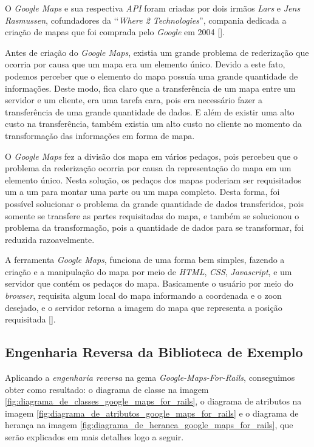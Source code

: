 O \emph{Google Maps} e sua respectiva \emph{API} foram criadas por dois irmãos \emph{Lars} e 
\emph{Jens Rasmussen}, cofundadores da ‘‘\emph{Where 2 Technologies}'', compania dedicada a criação de mapas
que foi comprada pelo \emph{Google} em 2004 [].

Antes de criação do \emph{Google Maps}, existia um grande problema de rederização que ocorria por causa
que um mapa era um elemento único. Devido a este fato, podemos perceber que o elemento do mapa
possuía uma grande quantidade de informações. Deste modo, fica claro que a transferência de um mapa entre
um servidor e um cliente, era uma tarefa cara, pois era necessário fazer a transferência de uma grande
quantidade de dados. E além de existir uma alto custo na transferência, também existia um alto custo no
cliente no momento da transformação das informações em forma de mapa.

O \emph{Google Maps} fez a divisão dos mapa em vários pedaços, pois percebeu que o problema da rederização 
ocorria por causa da representação do mapa em um elemento único. Nesta solução, os pedaços dos mapas
poderiam ser requisitados um a um para montar uma parte ou um mapa completo. Desta forma, foi possível
solucionar o problema da grande quantidade de dados transferidos, pois somente se transfere as partes
requisitadas do mapa, e também se solucionou o problema da transformação, pois a quantidade de dados
para se transformar, foi reduzida razoavelmente.

A ferramenta \emph{Google Maps}, funciona de uma forma bem simples, fazendo a criação e a manipulação do
mapa por meio de \emph{HTML}, \emph{CSS}, \emph{Javascript}, e um servidor que contém os pedaços do mapa.
Basicamente o usuário por meio do \emph{browser}, requisita algum local do mapa informando a coordenada
e o zoon desejado, e o servidor retorna a imagem do mapa que representa a posição requisitada
[]. 


\subsection{Engenharia Reversa da Biblioteca de Exemplo}
\label{subsection:engenharia_reversa_da_biblioteca_de_exemplo}


Aplicando a \emph{engenharia reversa} na gema \emph{Google-Maps-For-Rails}, conseguimos obter como resultado:
o diagrama de classe na imagem \ref{fig:diagrama_de_classes_google_maps_for_rails}, o diagrama de
atributos na imagem \ref{fig:diagrama_de_atributos_google_maps_for_rails} e o diagrama de herança na
imagem \ref{fig:diagrama_de_heranca_google_maps_for_rails}, que serão explicados em mais detalhes logo a
seguir.

